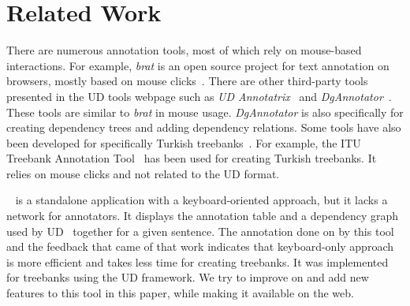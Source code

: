 \section{Related Work}
\label{sec:related}

There are numerous annotation tools, most of which rely on mouse-based interactions.
For example, \textit{brat} is an open source project for text annotation on browsers, mostly based on mouse clicks~\cite{brat,UD}.
There are other third-party tools presented in the UD tools webpage such as \textit{UD Annotatrix}~\cite{tyers-etal:2018} and \textit{DgAnnotator}~\cite{dgannotator}.
These tools are similar to \textit{brat} in mouse usage.
\textit{DgAnnotator} is also specifically for creating dependency trees and adding dependency relations.
Some tools have also been developed for specifically Turkish treebanks~\cite{turk-etal-2019-turkish}.
For example, the ITU Treebank Annotation Tool~\cite{pamay-etal-2015-annotation} has been used for creating Turkish treebanks.
It relies on mouse clicks and not related to the UD format.

\boatvone~\cite{turk-etal-2019-turkish} is a standalone application with a keyboard-oriented approach, but it lacks a network for annotators.
It displays the annotation table and a dependency graph used by UD~\cite{UD} together for a given sentence.
The annotation done on \bountreebank{} by this tool and the feedback that came of that work indicates that keyboard-only approach is more efficient and takes less time for creating treebanks.
It was implemented for treebanks using the UD framework.
We try to improve on and add new features to this tool in this paper, while making it available on the web.
